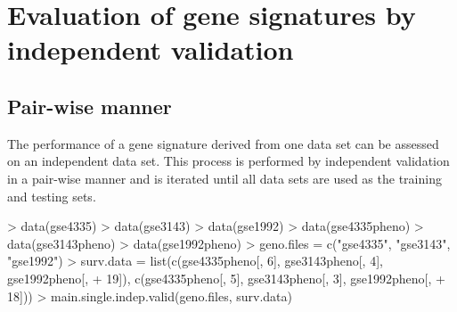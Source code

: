 \documentclass[a4paper]{article}
\begin{document}
\section{Evaluation of gene signatures by independent validation}
\subsection{Pair-wise manner}
The performance of a gene signature derived from one data set can be assessed on an independent data set. This process is performed by independent validation in a pair-wise manner and is iterated until all data sets are used as the training and testing sets.

\begin{Schunk}
\begin{Sinput}
> data(gse4335)
> data(gse3143)
> data(gse1992)
> data(gse4335pheno)
> data(gse3143pheno)
> data(gse1992pheno)
> geno.files = c("gse4335", "gse3143", "gse1992")
> surv.data = list(c(gse4335pheno[, 6], gse3143pheno[, 4], gse1992pheno[, 
+     19]), c(gse4335pheno[, 5], gse3143pheno[, 3], gse1992pheno[, 
+     18]))
> main.single.indep.valid(geno.files, surv.data)
\end{Sinput}
\end{Schunk}
\end{document}
